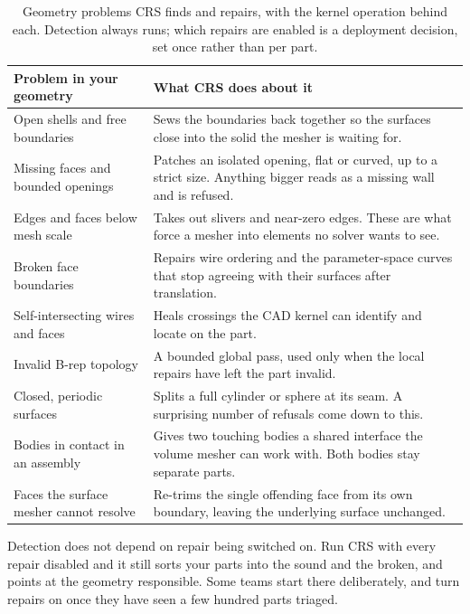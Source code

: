 \documentclass[10pt,onecolumn]{article}
\begin{document}
\begin{table}[h]
\centering
\caption{Geometry problems CRS finds and repairs, with the kernel operation behind each. Detection
always runs; which repairs are enabled is a deployment decision, set once rather than per part.}
\label{tab:coverage}
\footnotesize
\begin{tabularx}{\textwidth}{@{}L{46mm} X@{}}
\toprule
\textbf{Problem in your geometry} & \textbf{What CRS does about it}\\
\midrule
Open shells and free boundaries
  & Sews the boundaries back together so the surfaces close into the solid the mesher is waiting
    for.\\
Missing faces and bounded openings
  & Patches an isolated opening, flat or curved, up to a strict size. Anything bigger reads as a
    missing wall and is refused.\\
Edges and faces below mesh scale
  & Takes out slivers and near-zero edges. These are what force a mesher into elements no solver
    wants to see.\\
Broken face boundaries
  & Repairs wire ordering and the parameter-space curves that stop agreeing with their surfaces
    after translation.\\
Self-intersecting wires and faces
  & Heals crossings the CAD kernel can identify and locate on the part.\\
Invalid B-rep topology
  & A bounded global pass, used only when the local repairs have left the part invalid.\\
Closed, periodic surfaces
  & Splits a full cylinder or sphere at its seam. A surprising number of refusals come down to
    this.\\
Bodies in contact in an assembly
  & Gives two touching bodies a shared interface the volume mesher can work with. Both bodies stay
    separate parts.\\
Faces the surface mesher cannot resolve
  & Re-trims the single offending face from its own boundary, leaving the underlying surface
    unchanged.\\
\bottomrule
\end{tabularx}
\end{table}

Detection does not depend on repair being switched on. Run CRS with every repair disabled and it
still sorts your parts into the sound and the broken, and points at the geometry responsible. Some
teams start there deliberately, and turn repairs on once they have seen a few hundred parts
triaged.
\end{document}
